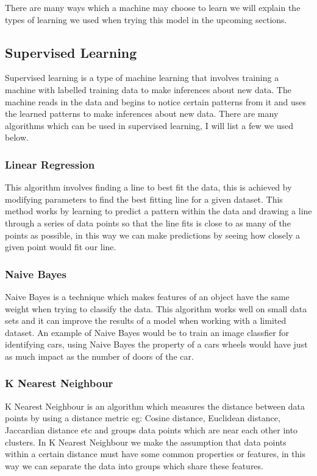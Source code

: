 \documentclass[conference]{IEEEtran}
\begin{document}
There are many ways which a machine may choose to learn we will explain the types of learning we used when trying this model in the upcoming sections.

\subsection{Supervised Learning}
Supervised learning is a type of machine learning that involves training a machine with labelled training data to make inferences about new data.  The machine reads in the data and begins to notice certain patterns from it and uses the learned patterns to make inferences about new data.  There are many algorithms which can be used in supervised learning, I will list a few we used below.  
\vspace{2mm}
\subsubsection{Linear Regression}
This algorithm involves finding a line to best fit the data, this is achieved by modifying parameters to find the best fitting line for a given dataset. This method works by learning to predict a pattern within the data and drawing a line through a series of data points so that the line fits is close to as many of the points as possible, in this way we can make predictions by seeing how closely a given point would fit our line.  
\vspace{2mm}
\subsubsection{Naive Bayes}
Naive Bayes is a technique which makes features of an object have the same weight when trying to classify the data.  This algorithm works well on small data sets and it can improve the results of a model when working with a limited dataset.  An example of Naive Bayes would be to train an image classfier for identifying cars, using Naive Bayes the property of a cars wheels would have just as much impact as the number of doors of the car.
\subsubsection{K Nearest Neighbour}
K Nearest Neighbour is an algorithm which measures the distance between data points by using a distance metric eg: Cosine distance, Euclidean distance, Jaccardian distance etc and groups data points which are near each other into clusters.  In K Nearest Neighbour we make the assumption that data points within a certain distance must have some common properties or features, in this way we can separate the data into groups which share these features.
\end{document}

